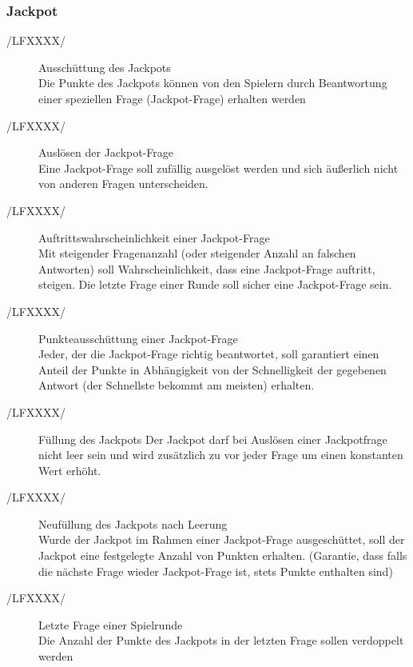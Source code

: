 \documentclass[11pt,a4paper]{scrreprt}
\begin{document}
\subsubsection{Jackpot}
\begin{description}
\item[/LFXXXX/] Ausschüttung des Jackpots \\
Die Punkte des Jackpots können von den Spielern durch Beantwortung einer speziellen Frage (Jackpot-Frage) erhalten werden

\item[/LFXXXX/]Auslösen der Jackpot-Frage \\
Eine Jackpot-Frage soll zufällig ausgelöst werden und sich äußerlich nicht von anderen Fragen unterscheiden.

\item[/LFXXXX/] Auftrittswahrscheinlichkeit einer Jackpot-Frage \\
Mit steigender Fragenanzahl (oder steigender Anzahl an falschen Antworten) soll Wahrscheinlichkeit, dass eine Jackpot-Frage auftritt, steigen. Die letzte Frage einer Runde soll sicher eine Jackpot-Frage sein.

\item[/LFXXXX/] Punkteausschüttung einer Jackpot-Frage \\
Jeder, der die Jackpot-Frage richtig beantwortet, soll garantiert einen Anteil der Punkte in Abhängigkeit von der Schnelligkeit der gegebenen Antwort (der Schnellste bekommt am meisten) erhalten.

\item[/LFXXXX/] Füllung des Jackpots
Der Jackpot darf bei Auslösen einer Jackpotfrage nicht leer sein und wird zusätzlich zu 
vor jeder Frage um einen konstanten Wert erhöht.

\item[/LFXXXX/] Neufüllung des Jackpots nach Leerung \\
Wurde der Jackpot im Rahmen einer Jackpot-Frage ausgeschüttet, soll der Jackpot eine festgelegte Anzahl von Punkten erhalten. (Garantie, dass falls die nächste Frage wieder Jackpot-Frage ist, stets Punkte enthalten sind)

\item[/LFXXXX/]Letzte Frage einer Spielrunde \\
Die Anzahl der Punkte des Jackpots in der letzten Frage sollen verdoppelt werden
\end{description}
\end{document}
